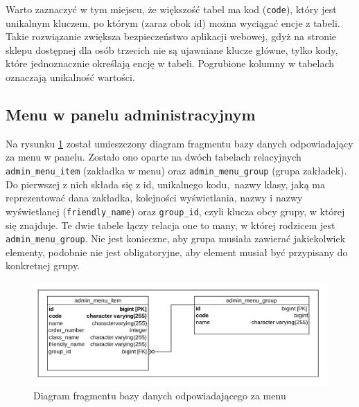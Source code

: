 Warto zaznaczyć w tym miejscu, że większość tabel ma kod (\texttt{code}), który jest unikalnym kluczem, po którym (zaraz obok id) można wyciągać encje z tabeli. Takie rozwiązanie zwiększa bezpieczeństwo aplikacji webowej, gdyż na stronie sklepu dostępnej dla osób trzecich nie są ujawniane klucze główne, tylko kody, które jednoznacznie określają encję w tabeli. Pogrubione kolumny w tabelach oznaczają unikalność wartości. 

\subsection{Menu w panelu administracyjnym}
Na rysunku \ref{db_menu} został umieszczony diagram fragmentu bazy danych odpowiadający za menu w panelu. Zostało ono oparte na dwóch tabelach relacyjnych \texttt{admin\_menu\_item} (zakładka w menu) oraz \texttt{admin\_menu\_group} (grupa zakładek). Do pierwszej z nich składa się z id, unikalnego kodu, nazwy klasy, jaką ma reprezentować dana zakładka, kolejności wyświetlania, nazwy i nazwy wyświetlanej (\texttt{friendly\_name}) oraz \texttt{group\_id}, czyli klucza obcy grupy, w której się znajduje. Te dwie tabele łączy relacja one to many, w której rodzicem jest \texttt{admin\_menu\_group}. Nie jest konieczne, aby grupa musiała zawierać jakiekolwiek elementy, podobnie nie jest obligatoryjne, aby element musiał być przypisany do konkretnej grupy. 

\begin{figure}
	\begin{center}
		\includegraphics[scale=0.3]{db_menu.png}
	\end{center}
	\caption{{\color{black}Diagram fragmentu bazy danych odpowiadającego za menu}} \label{db_menu}
\end{figure}


